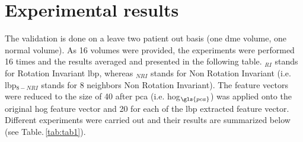 \section{ Experimental results}\label{sec:res}

The validation is done on a leave two patient out basis (one \gls{dme} volume, one normal volume).
As 16 volumes were provided, the experiments were performed 16 times and the results averaged and presented in the following table.
$_{RI}$ stands for Rotation Invariant \gls{lbp}, whereas $_{NRI}$ stands for Non Rotation Invariant (i.e. \gls{lbp}$_{8-NRI}$ stands for 8 neighbors Non Rotation Invariant).
The feature vectors were reduced to the size of 40 after \gls{pca} (i.e. \gls{hog}$_{\gls{pca}}$) was applied onto the original \gls{hog} feature vector and 20 for each of the \gls{lbp} extracted feature vector.
Different experiments were carried out and their results are summarized below (see Table.\,\ref{tab:tab1}).


\begin{table*}
\caption{Outline and summary of the performed experiments and obtained results.}
\centering
{}
\label{tab:tab1}
\end{table*}
